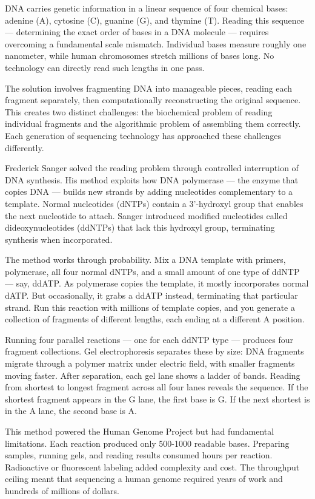 DNA carries genetic information in a linear sequence of four chemical bases: adenine (A), cytosine (C), guanine (G), and thymine (T). Reading this sequence — determining the exact order of bases in a DNA molecule — requires overcoming a fundamental scale mismatch. Individual bases measure roughly one nanometer, while human chromosomes stretch millions of bases long. No technology can directly read such lengths in one pass.

The solution involves fragmenting DNA into manageable pieces, reading each fragment separately, then computationally reconstructing the original sequence. This creates two distinct challenges: the biochemical problem of reading individual fragments and the algorithmic problem of assembling them correctly. Each generation of sequencing technology has approached these challenges differently.

Frederick Sanger solved the reading problem through controlled interruption of DNA synthesis. His method exploits how DNA polymerase — the enzyme that copies DNA — builds new strands by adding nucleotides complementary to a template. Normal nucleotides (dNTPs) contain a 3'-hydroxyl group that enables the next nucleotide to attach. Sanger introduced modified nucleotides called dideoxynucleotides (ddNTPs) that lack this hydroxyl group, terminating synthesis when incorporated.

The method works through probability. Mix a DNA template with primers, polymerase, all four normal dNTPs, and a small amount of one type of ddNTP — say, ddATP. As polymerase copies the template, it mostly incorporates normal dATP. But occasionally, it grabs a ddATP instead, terminating that particular strand. Run this reaction with millions of template copies, and you generate a collection of fragments of different lengths, each ending at a different A position.

Running four parallel reactions — one for each ddNTP type — produces four fragment collections. Gel electrophoresis separates these by size: DNA fragments migrate through a polymer matrix under electric field, with smaller fragments moving faster. After separation, each gel lane shows a ladder of bands. Reading from shortest to longest fragment across all four lanes reveals the sequence. If the shortest fragment appears in the G lane, the first base is G. If the next shortest is in the A lane, the second base is A.

This method powered the Human Genome Project but had fundamental limitations. Each reaction produced only 500-1000 readable bases. Preparing samples, running gels, and reading results consumed hours per reaction. Radioactive or fluorescent labeling added complexity and cost. The throughput ceiling meant that sequencing a human genome required years of work and hundreds of millions of dollars.

